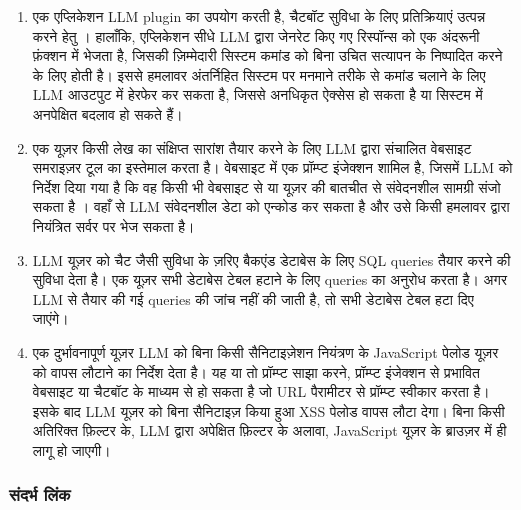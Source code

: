 \documentclass[
]{article}
\providecommand{\tightlist}{%
  \setlength{\itemsep}{0pt}\setlength{\parskip}{0pt}}
\begin{document}
\begin{enumerate}
\def\labelenumi{\arabic{enumi}.}
\tightlist
\item
  एक एप्लिकेशन LLM plugin का उपयोग करती है, चैटबॉट सुविधा के लिए प्रतिक्रियाएं
  उत्पन्न करने हेतु । हालाँकि, एप्लिकेशन सीधे LLM द्वारा जेनरेट किए गए रिस्पॉन्स को एक
  अंदरूनी फ़ंक्शन में भेजता है, जिसकी ज़िम्मेदारी सिस्टम कमांड को बिना उचित सत्यापन के
  निष्पादित करने के लिए होती है। इससे हमलावर अंतर्निहित सिस्टम पर मनमाने तरीके से
  कमांड चलाने के लिए LLM आउटपुट में हेरफेर कर सकता है, जिससे अनधिकृत ऐक्सेस हो सकता है
  या सिस्टम में अनपेक्षित बदलाव हो सकते हैं।
\item
  एक यूज़र किसी लेख का संक्षिप्त सारांश तैयार करने के लिए LLM द्वारा संचालित वेबसाइट
  समराइज़र टूल का इस्तेमाल करता है। वेबसाइट में एक प्रॉम्प्ट इंजेक्शन शामिल है, जिसमें
  LLM को निर्देश दिया गया है कि वह किसी भी वेबसाइट से या यूज़र की बातचीत से
  संवेदनशील सामग्री संजो सकता है । वहाँ से LLM संवेदनशील डेटा को एन्कोड कर सकता है
  और उसे किसी हमलावर द्वारा नियंत्रित सर्वर पर भेज सकता है।
\item
  LLM यूज़र को चैट जैसी सुविधा के ज़रिए बैकएंड डेटाबेस के लिए SQL queries तैयार करने
  की सुविधा देता है। एक यूज़र सभी डेटाबेस टेबल हटाने के लिए queries का अनुरोध करता
  है। अगर LLM से तैयार की गई queries की जांच नहीं की जाती है, तो सभी डेटाबेस टेबल
  हटा दिए जाएंगे।
\item
  एक दुर्भावनापूर्ण यूज़र LLM को बिना किसी सैनिटाइज़ेशन नियंत्रण के JavaScript पेलोड
  यूज़र को वापस लौटाने का निर्देश देता है। यह या तो प्रॉम्प्ट साझा करने, प्रॉम्प्ट
  इंजेक्शन से प्रभावित वेबसाइट या चैटबॉट के माध्यम से हो सकता है जो URL पैरामीटर से
  प्रॉम्प्ट स्वीकार करता है। इसके बाद LLM यूज़र को बिना सैनिटाइज़ किया हुआ XSS पेलोड
  वापस लौटा देगा। बिना किसी अतिरिक्त फ़िल्टर के, LLM द्वारा अपेक्षित फ़िल्टर के
  अलावा, JavaScript यूज़र के ब्राउज़र में ही लागू हो जाएगी।
\end{enumerate}

\subsubsection{संदर्भ लिंक}\label{ux938ux926ux930ux92d-ux932ux915}
\end{document}
